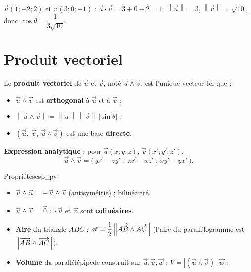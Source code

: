 \begin{exemple}
	$\vec u(1;-2;2)$ et $\vec v(3;0;-1)$ : $\vec u\cdot\vec v = 3 + 0 - 2 = 1$.
	$\left\|\vec u\right\| = 3$, $\left\|\vec v\right\| = \sqrt{10}$, donc
	$\cos\theta = \dfrac{1}{3\sqrt{10}}$.
\end{exemple}


\section{Produit vectoriel}

\begin{definition}
	Le \textbf{produit vectoriel} de $\vec u$ et $\vec v$, noté
	$\vec u \wedge \vec v$, est l'unique vecteur tel que :
	\begin{itemize}[label=\textbullet]
		\item $\vec u \wedge \vec v$ est \textbf{orthogonal} à $\vec u$ et à $\vec v$ ;
		\item $\left\|\vec u \wedge \vec v\right\| = \left\|\vec u\right\|\,\left\|\vec v\right\|\,\left|\sin\theta\right|$ ;
		\item $(\vec u,\ \vec v,\ \vec u \wedge \vec v)$ est une base \textbf{directe}.
	\end{itemize}

	\textbf{Expression analytique} : pour $\vec u(x;y;z)$, $\vec v(x';y';z')$,
	$$
	\vec u \wedge \vec v =
	\bigl(\,y z' - z y'\ ;\ z x' - x z'\ ;\ x y' - y x'\,\bigr).
	$$
\end{definition}

\begin{propriete}{Propriétés}{esp_pv}
	\begin{itemize}[label=\textbullet]
		\item $\vec v \wedge \vec u = -\,\vec u \wedge \vec v$ (antisymétrie) ;
		bilinéarité.
		\item $\vec u \wedge \vec v = \vec 0 \iff \vec u$ et $\vec v$ sont
		\textbf{colinéaires}.
		\item \textbf{Aire} du triangle $ABC$ :
		$\mathscr{A} = \dfrac{1}{2}\left\|\overrightarrow{AB} \wedge \overrightarrow{AC}\right\|$
		(l'aire du parallélogramme est $\left\|\overrightarrow{AB} \wedge \overrightarrow{AC}\right\|$).
		\item \textbf{Volume} du parallélépipède construit sur
		$\vec u,\vec v,\vec w$ : $V = \left|(\vec u \wedge \vec v)\cdot\vec w\right|$.
	\end{itemize}
\end{propriete}

